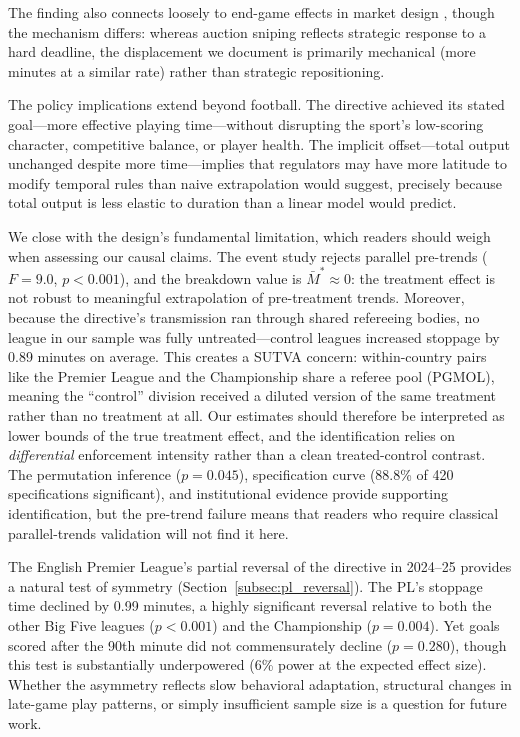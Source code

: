 \documentclass[12pt]{article}
\begin{document}
The finding also connects loosely to end-game effects in market design \citep{rothockenfels2002}, though the mechanism differs: whereas auction sniping reflects strategic response to a hard deadline, the displacement we document is primarily mechanical (more minutes at a similar rate) rather than strategic repositioning.

The policy implications extend beyond football. The directive achieved its
stated goal---more effective playing time---without disrupting the sport's
low-scoring character, competitive balance, or player health. The implicit offset---total output unchanged despite more time---implies that
regulators may have more latitude to modify temporal rules than naive
extrapolation would suggest, precisely because total output is less
elastic to duration than a linear model would predict.

We close with the design's fundamental limitation, which readers should weigh when assessing our causal claims. The event study rejects parallel pre-trends ($F = 9.0$, $p < 0.001$), and the \citet{rambachan2023more} breakdown value is $\bar{M}^* \approx 0$: the treatment effect is not robust to meaningful extrapolation of pre-treatment trends. Moreover, because the directive's transmission ran through shared refereeing bodies, no league in our sample was fully untreated---control leagues increased stoppage by 0.89 minutes on average. This creates a SUTVA concern: within-country pairs like the Premier League and the Championship share a referee pool (PGMOL), meaning the ``control'' division received a diluted version of the same treatment rather than no treatment at all. Our estimates should therefore be interpreted as lower bounds of the true treatment effect, and the identification relies on \emph{differential} enforcement intensity rather than a clean treated-control contrast. The permutation inference ($p = 0.045$), specification curve (88.8\% of 420 specifications significant), and institutional evidence provide supporting identification, but the pre-trend failure means that readers who require classical parallel-trends validation will not find it here.

The English Premier League's partial reversal of the directive in 2024--25 provides a natural test of symmetry (Section~\ref{subsec:pl_reversal}). The PL's stoppage time declined by 0.99 minutes, a highly significant reversal relative to both the other Big Five leagues ($p < 0.001$) and the Championship ($p = 0.004$). Yet goals scored after the 90th minute did not commensurately decline ($p = 0.280$), though this test is substantially underpowered (6\% power at the expected effect size). Whether the asymmetry reflects slow behavioral adaptation, structural changes in late-game play patterns, or simply insufficient sample size is a question for future work.
\end{document}
